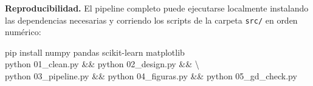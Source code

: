 \documentclass[11pt,a4paper]{article}
\theoremstyle{simple}
\begin{document}
\vspace{6pt}
\noindent\textbf{Reproducibilidad.} El pipeline completo puede ejecutarse localmente instalando las dependencias necesarias y corriendo los scripts de la carpeta \texttt{src/} en orden num\'erico:

\begin{center}
\colorbox{gray!10}{%
\parbox{0.92\linewidth}{\ttfamily\small
pip install numpy pandas scikit-learn matplotlib\\[2pt]
python 01\_clean.py \&\& python 02\_design.py \&\& \textbackslash\\
python 03\_pipeline.py \&\& python 04\_figuras.py \&\& python 05\_gd\_check.py}}
\end{center}
\end{document}
